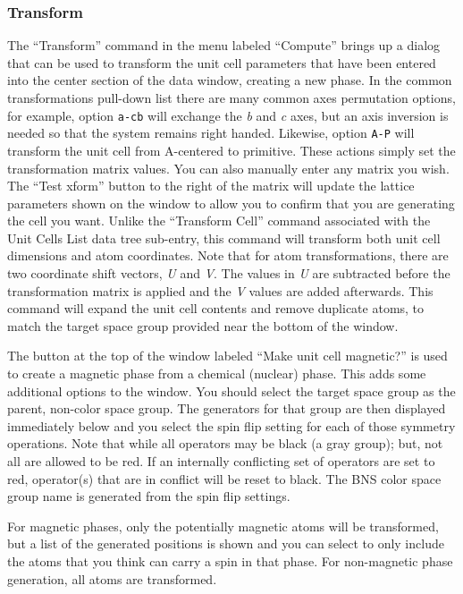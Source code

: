 \subsubsection{Transform}
The ``Transform'' command in the menu labeled ``Compute'' brings up a dialog that can be used to transform the unit cell parameters that have been entered into the center section of the data window,  creating a new phase. In the common transformations pull-down list there are many common axes permutation options, for example, option \texttt{a-cb} will exchange the \textit{b} and \textit{c} axes, but an axis inversion is needed so that the system remains right handed. Likewise, option \texttt{A-P} will transform the unit cell from A-centered to primitive. These actions simply set the transformation matrix values. You can also manually enter any matrix you wish. The ``Test xform'' button  to the right of the matrix will update the lattice parameters shown on the window to allow you to confirm that you are generating the cell you want. Unlike the ``Transform Cell'' command associated with the Unit Cells List data tree sub-entry, this command will transform both unit cell dimensions and atom coordinates. Note that for atom transformations, there are two coordinate shift vectors, \textit{U} and \textit{V}.  The values in \textit{U} are subtracted before the transformation matrix is applied and the \textit{V} values are added afterwards.  This command will expand the unit cell contents and remove duplicate atoms, to match the target space group provided near the bottom of the window. 

The button at the top of the window labeled ``Make unit cell magnetic?'' is used to create a magnetic phase from a chemical (nuclear) phase. This adds some additional options to the window. You should select the target space group as the parent, non-color space group. The generators for that group are then displayed immediately below and you select the spin flip setting for each of those symmetry operations. 
Note that while all operators may be black (a gray group); but, not all are allowed to be red. If an internally conflicting set of operators are set to red, operator(s) that are in conflict will be reset to black. 
The BNS color space group name is generated from the spin flip settings. 

For magnetic phases, only the potentially magnetic atoms will be transformed, but a list of the generated positions is shown and you can select to only include the atoms that you think can carry a spin in that phase. For non-magnetic phase generation, all atoms are transformed. 

